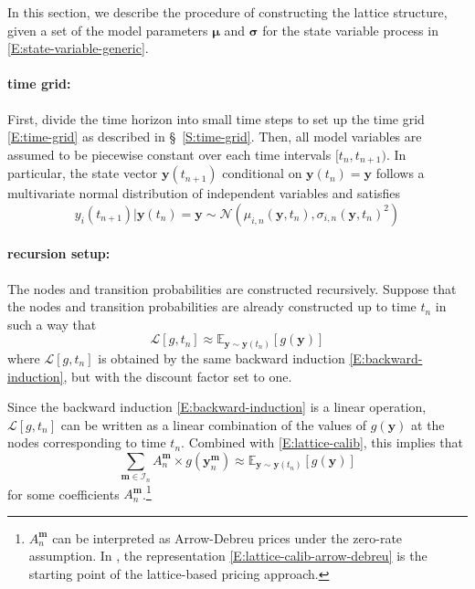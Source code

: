 \documentclass{texyise}
\newcommand{\indexset}{\mathcal{I}}
\newcommand{\valuebackwardnodisc}{\mathcal{L}}
\begin{document}
In this section, we describe the procedure of constructing the lattice structure, given a set of the model parameters $\bm{\mu}$ and $\bm{\sigma}$ for the state variable process in \eqref{E:state-variable-generic}.

\paragraph*{time grid:}

First, divide the time horizon into small time steps to set up the time grid \eqref{E:time-grid} as described in \S~\ref{S:time-grid}. Then, all model variables are assumed to be piecewise constant over each time intervals $[t_n, t_{n+1})$.
In particular, the state vector $\bm{y}(t_{n+1})$ conditional on $\bm{y}(t_n) = \bm{y}$ follows a multivariate normal distribution of independent variables and satisfies
\begin{equation}
    y_i(t_{n+1}) | \bm{y}(t_n) = \bm{y}  \sim \mathcal{N}(\mu_{i,n}(\bm{y},t_n), \sigma_{i,n}(\bm{y},t_n)^2)
    \label{E:conditional-distribution}
\end{equation}

\paragraph*{recursion setup:}

The nodes and transition probabilities are constructed recursively. Suppose that the nodes and transition probabilities are already constructed up to time $t_n$ in such a way that 
\begin{equation}
    \valuebackwardnodisc[g, t_n] \approx \mathbb{E}_{\bm{y}\sim\bm{y}(t_n)}\left[ g(\bm{y}) \right] 
    \label{E:lattice-calib}
\end{equation}
where $\valuebackwardnodisc[g, t_n]$ is obtained by the same backward induction \eqref{E:backward-induction}, but with the discount factor set to one. 

Since the backward induction \eqref{E:backward-induction} is a linear operation, 
$\valuebackwardnodisc[g, t_n]$ can be written as a linear combination of the values of $g(\bm{y})$ at the nodes corresponding to time $t_n$. Combined with \eqref{E:lattice-calib}, this implies that
\begin{equation}
\sum_{\bm{m} \in \indexset_n} A_{n}^{\bm{m}} \times g(\bm{y}_n^{\bm{m}}) \approx \mathbb{E}_{\bm{y}\sim \bm{y}(t_n)}\left[ g(\bm{y}) \right] 
\label{E:lattice-calib-arrow-debreu}
\end{equation}
for some coefficients $A_{n}^{\bm{m}}$.\footnote{$A_{n}^{\bm{m}}$ can be interpreted as Arrow-Debreu prices under the zero-rate assumption. In \cite{2fs-citi-mv}, the representation \eqref{E:lattice-calib-arrow-debreu}
is the starting point of the lattice-based pricing approach.}
\end{document}
